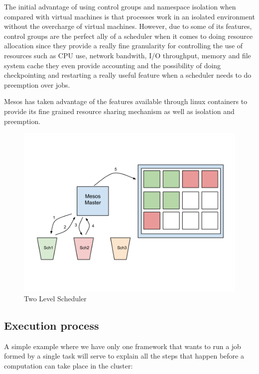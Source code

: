 \documentclass{svjour3}                     %
\begin{document}
The initial advantage of using control groups and namespace isolation when
compared with virtual machines is that processes work in an isolated
environment without the overcharge of virtual machines. However, due
to some of its features, control groups are the perfect ally of a
scheduler when it comes to doing resource allocation since they provide
a really fine granularity for controlling the use of resources such
as CPU use, network bandwith, I/O throughput, memory and file system 
cache they even provide accounting and the possibility of doing
checkpointing and restarting a really useful feature when a scheduler
needs to do preemption over jobs.

Mesos has taken advantage of the features available through linux containers
\cite{_linux_????} to provide its fine grained resource sharing
mechanism as well as isolation and preemption.

\begin{figure}[!ht]
  \centering
  \includegraphics[scale=0.25,natwidth=960,natheight=720]{TwoLevel.png}
  \caption{Two Level Scheduler}
  \label{fig:two_level}
\end{figure}


\subsection{Execution process}

A simple example where we have only one framework that wants to run a 
job formed by a single task will serve to explain all the steps that happen
before a computation can take place in the cluster:
\end{document}
